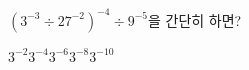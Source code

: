 $(3^{-3}\div 27^{-2})^{-4}\div 9^{-5}$을 간단히 하면?
\begin{choices32}{$3^{-2}$}{$3^{-4}$}{$3^{-6}$}{$3^{-8}$}{$3^{-10}$}\end{choices32}
